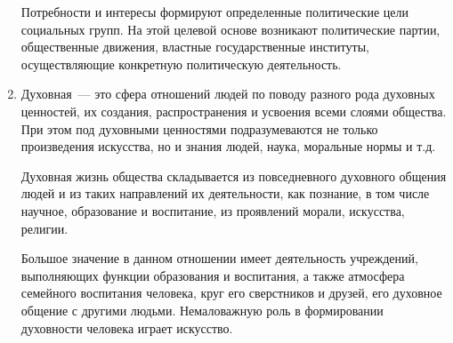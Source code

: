 \begin{enumerate}
        Потребности и интересы формируют определенные политические цели социальных групп. На этой
        целевой основе возникают политические партии, общественные движения, властные государственные
        институты, осуществляющие конкретную политическую деятельность. 
        
    \item Духовная~--– это сфера отношений людей по поводу разного рода духовных ценностей, их
        создания, распространения и усвоения всеми слоями общества. При этом под духовными ценностями
        подразумеваются не только произведения искусства, но и знания людей, наука, моральные нормы
        и т.д.
        
        Духовная жизнь общества складывается из повседневного духовного общения людей и из таких
        направлений их деятельности, как познание, в том числе научное, образование и воспитание, из
        проявлений морали, искусства, религии.
        
        Большое значение в данном отношении имеет деятельность учреждений, выполняющих функции
        образования и воспитания, а также атмосфера семейного воспитания человека, круг его
        сверстников и друзей, его духовное общение с другими людьми. Немаловажную роль в формировании
        духовности человека играет искусство.
\end{enumerate}
